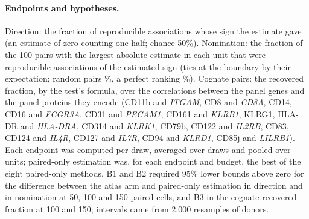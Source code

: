\paragraph{Endpoints and hypotheses.} Direction: the fraction of reproducible associations whose sign the estimate gave (an estimate of zero counting one half; chance 50\%). Nomination: the fraction of the 100 pairs with the largest absolute estimate in each unit that were reproducible associations of the estimated sign (ties at the boundary by their expectation; random pairs \BoRandomTwo\%, a perfect ranking \BoPerfectTwo\%). Cognate pairs: the recovered fraction, by the test's formula, over the correlations between the \BoNCognate{} panel genes and the panel proteins they encode (CD11b and \textit{ITGAM}, CD8 and \textit{CD8A}, CD14, CD16 and \textit{FCGR3A}, CD31 and \textit{PECAM1}, CD161 and \textit{KLRB1}, KLRG1, HLA-DR and \textit{HLA-DRA}, CD314 and \textit{KLRK1}, CD79b, CD122 and \textit{IL2RB}, CD83, CD124 and \textit{IL4R}, CD127 and \textit{IL7R}, CD94 and \textit{KLRD1}, CD85j and \textit{LILRB1}). Each endpoint was computed per draw, averaged over draws and pooled over units; paired-only estimation was, for each endpoint and budget, the best of the eight paired-only methods. B1 and B2 required 95\% lower bounds above zero for the difference between the atlas arm and paired-only estimation in direction and in nomination at 50, 100 and 150 paired cells, and B3 in the cognate recovered fraction at 100 and 150; intervals came from 2,000 resamples of donors.

